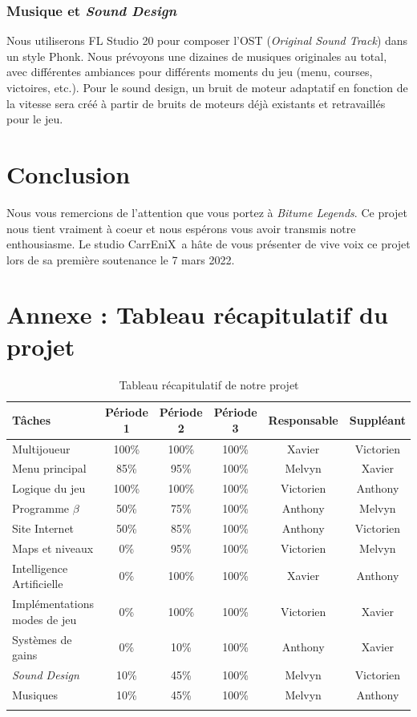 \documentclass[12pt,a4paper]{article}
\newcommand{\btmlgs}{\textit{Bitume Legends}}
\newcommand{\AI}{Intelligence Artificielle}
\newcommand{\CEX}{CarrEniX}
\begin{document}
    \subsubsection{Musique et \textit{Sound Design}}
      Nous utiliserons FL Studio 20 pour composer l'OST (\textit{Original Sound Track}) dans un style Phonk.
      Nous prévoyons une dizaines de musiques originales au total, avec différentes ambiances pour
      différents moments du jeu (menu, courses, victoires, etc.). Pour le sound design, un bruit de 
      moteur adaptatif en fonction de la vitesse sera créé à partir de bruits de moteurs déjà 
      existants et retravaillés pour le jeu.
\clearpage

\section{Conclusion}
    Nous vous remercions de l'attention que vous portez à \btmlgs.
    Ce projet nous tient vraiment à coeur et nous espérons vous avoir transmis notre enthousiasme.
    Le studio \CEX\, a hâte de vous présenter de vive voix ce projet lors de sa première soutenance le 7 mars 2022.


\section{Annexe : Tableau récapitulatif du projet}
\renewcommand{\arraystretch}{1.2}
\setlength{\LTleft}{-1cm plus 1 fill}
\setlength{\LTright}{-1cm plus 1 fill}
\begin{longtable}{| p{4.5cm} || c | c | c | c | c |}
  \hline
  Tâches & Période 1 & Période 2 & Période 3 & Responsable & Suppléant\\\hline\hline
  Multijoueur & 100\% & 100\% & 100\% & Xavier & Victorien \\\hline
  Menu principal & 85\% & 95\% & 100\% & Melvyn & Xavier \\\hline
  Logique du jeu & 100\% & 100\%  & 100\% & Victorien & Anthony\\\hline
  Programme \(\beta\) & 50\% & 75\% & 100\% & Anthony & Melvyn \\\hline
  Site Internet & 50\% & 85\%  & 100\% & Anthony & Victorien\\\hline
  Maps et niveaux & 0\% & 95\%  & 100\% & Victorien & Melvyn\\\hline
  \AI & 0\% & 100\%  & 100\% & Xavier & Anthony\\\hline
  Implémentations modes de jeu & 0\% & 100\%  & 100\% & Victorien & Xavier\\\hline
  Systèmes de gains & 0\% & 10\%  & 100\% & Anthony & Xavier\\\hline
  \textit{Sound Design} & 10\% & 45\% & 100\% & Melvyn & Victorien\\\hline
  Musiques & 10\% & 45\%  & 100\% & Melvyn & Anthony \\\hline
  \caption{Tableau récapitulatif de notre projet}
\end{longtable}
\end{document}
